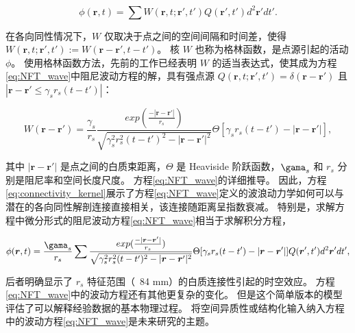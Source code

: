 \documentclass[lang=cn,a4paper,newtx]{elegantpaper}
\begin{document}
\begin{equation}\label{eq:location_activity}
	\phi(\boldsymbol{r}, t) = 
		\sum
			W(\boldsymbol{r}, t; \boldsymbol{r}', t')
			Q(\boldsymbol{r}', t')
			d^2
			\boldsymbol{r}'
			dt'.
\end{equation}


在各向同性情况下，$ W $ 仅取决于点之间的空间间隔和时间差，使得 $ W(\boldsymbol{r}, t; \boldsymbol{r}', t') := W(\boldsymbol{r} - \boldsymbol{r}', t-t') $。
核 $ W $ 也称为格林函数，是点源引起的活动 $ \phi $。
使用格林函数方法\cite{pang2021stochastic}，先前的工作已经表明 $ W $ 的适当表达式，使其成为方程\ref{eq:NFT_wave}中阻尼波动方程的解，具有强点源 
$ Q(\boldsymbol{r}, t; \boldsymbol{r}', t') = \delta(\boldsymbol{r} - \boldsymbol{r}') $ 且 
$ |\boldsymbol{r} - \boldsymbol{r}' \leq \gamma_s r_s (t-t')| $：\cite{wright1995simulation,jirsa1996field,robinson1997propagation,nozari2020brain}

\begin{equation}\label{eq:connectivity_kernel}
	W(\boldsymbol{r} - \boldsymbol{r}') = 
		\frac{\gamma_s}{r_s}
		\frac{exp(\frac{-|\boldsymbol{r}-\boldsymbol{r}'|}{r_s})}{\sqrt{\gamma_s^2 r_s^2 (t-t')^2 - |\boldsymbol{r} - \boldsymbol{r}'|^2}}
		\Theta
		[\gamma_s r_s (t-t') - |\boldsymbol{r} - \boldsymbol{r}'|],
\end{equation}

其中 $ |\boldsymbol{r} - \boldsymbol{r}'| $ 是点之间的白质束距离，$ \Theta $ 是 Heaviside 阶跃函数，$ \gama_s $ 和 $ r_s $ 分别是阻尼率和空间长度尺度。
方程\ref{eq:NFT_wave}的详细推导。 
因此，方程\ref{eq:connectivity_kernel}展示了方程\ref{eq:NFT_wave}定义的波浪动力学如何可以与潜在的各向同性解剖连接直接相关，该连接随距离呈指数衰减。
特别是，求解方程中微分形式的阻尼波动方程\ref{eq:NFT_wave}相当于求解积分方程，

\begin{equation}\label{eq:integral_equation}
	\phi(\boldsymbol{r}, t) = 
		\frac{\gama_s}{r_s} \sum
			\frac{exp(\frac{-|\boldsymbol{r}-\boldsymbol{r}'|}{r_s})}{\sqrt{\gamma_s^2 r_s^2 (t-t')^2 - |\boldsymbol{r} - \boldsymbol{r}'|^2}}
			\Theta
			[\gamma_s r_s (t-t') - |\boldsymbol{r} - \boldsymbol{r}'|]
			Q(\boldsymbol{r}', t')
			d^2 \boldsymbol{r}'
			dt',
\end{equation}

后者明确显示了 $ r_s $ 特征范围（~84 mm\cite{robinson1997propagation}）的白质连接性引起的时空效应。
方程\ref{eq:NFT_wave}中的波动方程还有其他更复杂的变化。
但是这个简单版本的模型评估了可以解释经验数据的基本物理过程。
将空间异质性或结构化输入纳入方程中的波动方程\ref{eq:NFT_wave}是未来研究的主题。
\end{document}
